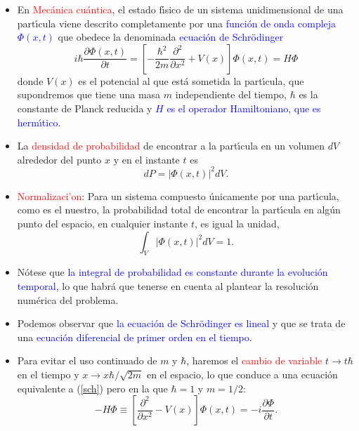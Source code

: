 \documentclass[12pt]{iopart}
\def\az{\textcolor{blue}}
\def\ro{\textcolor{red}}
\begin{document}
\begin{itemize}

\item En \ro{Mec\'anica cu\'antica}, el estado f\'{\i}sico de un sistema unidimensional de una part\'{\i}cula viene
descrito completamente por una \az{funci\'on de onda compleja $\Phi(x,t)$} que obedece la denominada \az{ecuaci\'on 
de Schr\"odinger}
%
\begin{equation}
\label{sch}
i\hbar \frac{\partial \Phi(x,t)}{\partial t} =
\left[ -\frac{\hbar^2}{2m}  \frac{\partial^2}{\partial x^2} + V(x) \right] \Phi(x,t)= H\Phi
\end{equation}
%
donde $V(x)$ es el potencial al que est\'a sometida la part\'{\i}cula, 
que supondremos que tiene una masa $m$ independiente del tiempo, $\hbar$  es la constante
de Planck reducida y \az{$H$ es el operador Hamiltoniano, que es herm\'{\i}tico}.

\item La \ro{densidad de probabilidad} de encontrar a la part\'{\i}cula en un volumen $dV$ alrededor del 
punto $x$ y en el instante $t$ es 
%
\begin{equation}
dP=|\Phi(x,t)|^2 dV.
\end{equation}
%

\item \ro{Normalizaci'on}: Para un sistema compuesto \'unicamente por una part\'{\i}cula, como es el nuestro, la
probabilidad total de encontrar la part\'{\i}cula en alg\'un punto del espacio,
en cualquier instante $t$, es igual la unidad,
%
\begin{equation}
\label{3}
\int_V |\Phi(x,t)|^2 dV=1.
\end{equation}
%

\item N\'otese que \az{la integral de probabilidad es constante durante la evoluci\'on
temporal}, lo que habr\'a que tenerse en cuenta al plantear la resoluci\'on
num\'erica del problema.

\item Podemos observar que \az{la ecuaci\'on de Schr\"odinger es lineal} y
que se trata de una \az{ecuaci\'on diferencial de primer orden en el tiempo}.

\item Para evitar el uso continuado de $m$ y $\hbar$, haremos el \ro{cambio de variable} $t\rightarrow t\hbar$
en el tiempo  y $x\rightarrow x \hbar/\sqrt{2m}$ en 
el espacio, lo que conduce a una ecuaci{\'o}n equivalente a (\ref{sch}) pero en la que $\hbar=1$ y
$m=1/2$:
%
\begin{equation}
\label{7}
-H\Phi\equiv \left[ \frac{\partial^2}{\partial x^2}- V(x) \right]\Phi(x,t) =
-i\frac{\partial \Phi}{\partial t}.
\end{equation}


\end{itemize}
\end{document}
